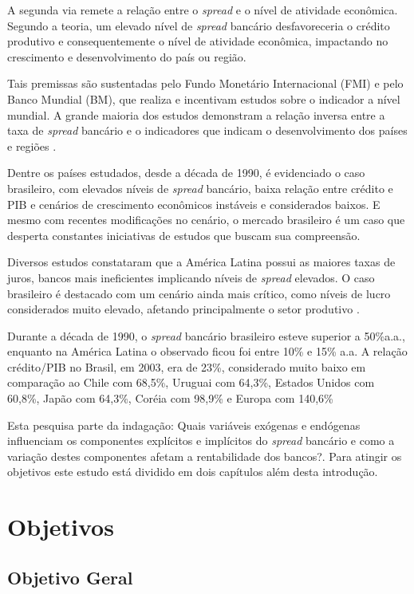 \documentclass[12pt,openright,oneside,a4paper,chapter=TITLE,section=TITLE,subsection=TITLE,english,french,spanish,portugues,sumario=tradicional]{abntex2}
\begin{document}
A segunda via remete a relação entre o \emph{spread} e o nível de atividade
econômica. Segundo a teoria, um elevado nível de \emph{spread} bancário
desfavoreceria o crédito produtivo e consequentemente o nível de atividade
econômica, impactando no crescimento e desenvolvimento do país ou região.

Tais premissas são sustentadas pelo Fundo Monetário Internacional (FMI) e pelo
Banco Mundial (BM), que realiza e incentivam estudos sobre o indicador a
nível mundial. A grande maioria dos estudos demonstram a relação inversa entre a taxa de \emph{spread} bancário e o indicadores que indicam o desenvolvimento dos
países e regiões \cite{WB:2005}.

Dentre os países estudados, desde a década de 1990, é evidenciado o caso brasileiro, com elevados níveis de \emph{spread} bancário, baixa relação entre crédito e PIB e cenários de crescimento econômicos instáveis e considerados baixos. E mesmo com recentes modificações no cenário, o mercado brasileiro é um caso que desperta constantes iniciativas de estudos que buscam sua compreensão.

Diversos estudos constataram que a América Latina possui as maiores taxas de
juros, bancos mais ineficientes implicando níveis de \emph{spread} elevados. O caso
brasileiro é destacado com um cenário ainda mais crítico, como níveis de lucro
considerados muito elevado, afetando principalmente o setor produtivo \cite{dantas:2012}.

Durante a década de 1990, o \emph{spread} bancário brasileiro esteve superior a
50\%a.a., enquanto na América Latina o observado ficou foi entre 10\% e 15\% a.a.
A relação crédito/PIB no Brasil, em 2003, era de 23\%, considerado muito baixo
em comparação ao Chile com 68,5\%, Uruguai com 64,3\%, Estados Unidos com 60,8\%,
Japão com 64,3\%, Coréia com 98,9\% e Europa com 140,6\% \cite{camargo:2009,leal:2006}

Esta pesquisa parte da indagação: Quais variáveis exógenas e endógenas
influenciam os componentes explícitos e implícitos do \emph{spread} bancário e como
a variação destes componentes afetam a rentabilidade dos bancos?. Para atingir
os objetivos este estudo está dividido em dois capítulos além desta introdução.

\section{Objetivos}

\subsection{Objetivo Geral}
\end{document}
